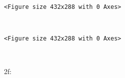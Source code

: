 \documentclass[11pt]{article}
\begin{document}
    
    \begin{verbatim}
<Figure size 432x288 with 0 Axes>
    \end{verbatim}

    
    \begin{center}
    \end{center}
    { \hspace*{\fill} \\}
    
    
    \begin{verbatim}
<Figure size 432x288 with 0 Axes>
    \end{verbatim}

    
    \begin{center}
    \end{center}
    { \hspace*{\fill} \\}
    
    2f:
\end{document}
